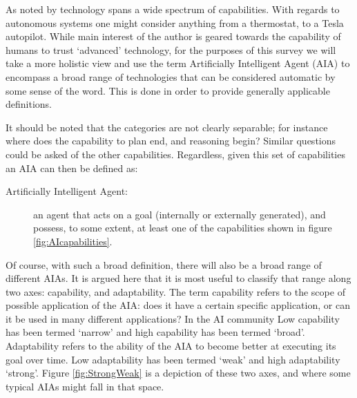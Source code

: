     As noted by \citet{Tripp2011-cq} technology spans a wide spectrum of capabilities. With regards to autonomous systems one might consider anything from a thermostat, to a Tesla autopilot. While main interest of the author is geared towards the capability of humans to trust `advanced' technology, for the purposes of this survey we will take a more holistic view and use the term Artificially Intelligent Agent (AIA) to encompass a broad range of technologies that can be considered automatic by some sense of the word. This is done in order to provide generally applicable definitions.

    It should be noted that the categories are not clearly separable; for instance where does the capability to plan end, and reasoning begin? Similar questions could be asked of the other capabilities. Regardless, given this set of capabilities an AIA can then be defined as:
    
    \begin{description}
        \item[Artificially Intelligent Agent:] an agent that acts on a goal (internally or externally generated), and possess, to some extent, at least one of the capabilities shown in figure \ref{fig:AIcapabilities}.
    \end{description}

    Of course, with such a broad definition, there will also be a broad range of different AIAs. It is argued here that it is most useful to classify that range along two axes: capability, and adaptability. The term capability refers to the scope of possible application of the AIA: does it have a certain specific application, or can it be used in many different applications? In the AI community Low capability has been termed `narrow' and high capability has been termed `broad'. Adaptability refers to the ability of the AIA to become better at executing its goal over time. Low adaptability has been termed `weak' and high adaptability `strong'. Figure \ref{fig:StrongWeak} is a depiction of these two axes, and where some typical AIAs might fall in that space.

